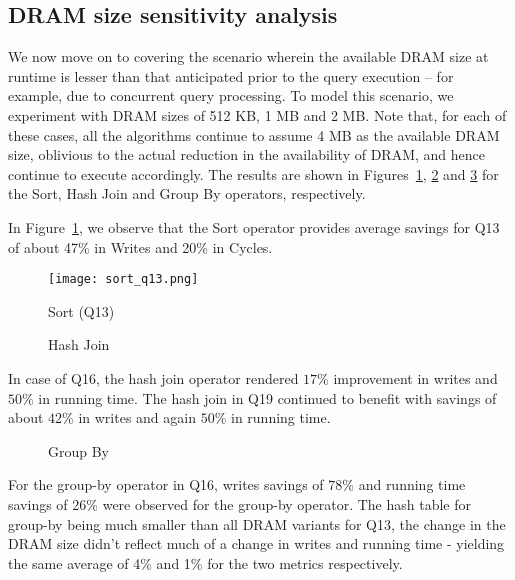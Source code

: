 \subsection{DRAM size sensitivity analysis}
We now move on to covering the scenario wherein the available DRAM
size at runtime is lesser than that anticipated prior to the query
execution -- for example, due to concurrent query processing. 
To model this scenario, we experiment with DRAM sizes of 512 KB, 1 MB and
2 MB. Note that, for each of these cases, all the algorithms continue to assume 4 MB as the available DRAM size, oblivious to the actual reduction in the availability of DRAM, and hence continue to execute accordingly. The results are shown in Figures~\ref{fig:sort}, \ref{fig:join}
and \ref{fig:gby} for the Sort, Hash Join and Group By operators, respectively.

In Figure~\ref{fig:sort}, we observe that the Sort operator provides average savings
for Q13 of about 47\% in Writes and 20\% in Cycles.

\begin{figure}[h]
	\centering
	\texttt{[image: sort\_q13.png]}
    \caption{Sort (Q13)}
	\label{fig:sort}
\end{figure}







\begin{figure}[h]
	\centering
	\hspace{0mm}
	\caption{Hash Join}
	\label{fig:join}
\end{figure}
In case of Q16, the hash join operator rendered $17\%$ improvement in
writes and $50\%$ in running time. The hash join in Q19 continued to benefit with savings of about $42\%$ in writes and again $50\%$
in running time.

\begin{figure}[htbp]
\centering
{}
\hspace{0mm}

\caption{Group By}
\label{fig:gby}
\end{figure}
For the group-by operator in Q16, writes savings of $78\%$ and running time savings of $26\%$
were observed for the group-by operator. The hash table for group-by being much smaller than all DRAM variants for Q13, the
change in the DRAM size didn't reflect much of a change in writes and
running time - yielding the same average of 4\% and 1\% for the two
metrics respectively.


